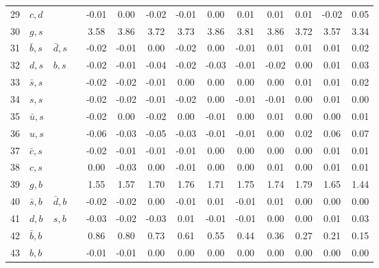 \begin{tabularx}{\textwidth}{rXXX@{}S@{}S@{}S@{}S@{}S@{}S@{}S@{}S@{}S@{}S}
 29 & $c, d$           &                   &                  & -0.01 &  0.00 & -0.02 & -0.01 &  0.00 &  0.01 &  0.01 &  0.01 & -0.02 &  0.05 \\
 30 & $g, s$           &                   &                  &  3.58 &  3.86 &  3.72 &  3.73 &  3.86 &  3.81 &  3.86 &  3.72 &  3.57 &  3.34 \\
 31 & $\bar b, s$      & $\bar d, s$       &                  & -0.02 & -0.01 &  0.00 & -0.02 &  0.00 & -0.01 &  0.01 &  0.01 &  0.01 &  0.02 \\
 32 & $d, s$           & $b, s$            &                  & -0.02 & -0.01 & -0.04 & -0.02 & -0.03 & -0.01 & -0.02 &  0.00 &  0.01 &  0.03 \\
 33 & $\bar s, s$      &                   &                  & -0.02 & -0.02 & -0.01 &  0.00 &  0.00 &  0.00 &  0.00 &  0.01 &  0.01 &  0.02 \\
 34 & $s, s$           &                   &                  & -0.02 & -0.02 & -0.01 & -0.02 &  0.00 & -0.01 & -0.01 &  0.00 &  0.01 &  0.00 \\
 35 & $\bar u, s$      &                   &                  & -0.02 &  0.00 & -0.02 &  0.00 & -0.01 &  0.00 &  0.01 &  0.00 &  0.00 &  0.01 \\
 36 & $u, s$           &                   &                  & -0.06 & -0.03 & -0.05 & -0.03 & -0.01 & -0.01 &  0.00 &  0.02 &  0.06 &  0.07 \\
 37 & $\bar c, s$      &                   &                  & -0.02 & -0.01 & -0.01 & -0.01 &  0.00 &  0.00 &  0.00 &  0.00 &  0.01 &  0.01 \\
 38 & $c, s$           &                   &                  &  0.00 & -0.03 &  0.00 & -0.01 &  0.00 &  0.00 &  0.01 &  0.00 &  0.01 &  0.01 \\
 39 & $g,  b$          &                   &                  &  1.55 &  1.57 &  1.70 &  1.76 &  1.71 &  1.75 &  1.74 &  1.79 &  1.65 &  1.44 \\
 40 & $\bar s, b$      & $\bar d, b$       &                  & -0.02 & -0.02 &  0.00 & -0.01 &  0.01 & -0.01 &  0.01 &  0.00 &  0.00 &  0.00 \\
 41 & $d, b$           & $s, b$            &                  & -0.03 & -0.02 & -0.03 &  0.01 & -0.01 & -0.01 &  0.00 &  0.00 &  0.01 &  0.03 \\
 42 & $\bar b, b$      &                   &                  &  0.86 &  0.80 &  0.73 &  0.61 &  0.55 &  0.44 &  0.36 &  0.27 &  0.21 &  0.15 \\
 43 & $b, b$           &                   &                  & -0.01 & -0.01 &  0.00 &  0.00 &  0.00 &  0.00 &  0.00 &  0.00 &  0.00 &  0.00 \\

\end{tabularx}
